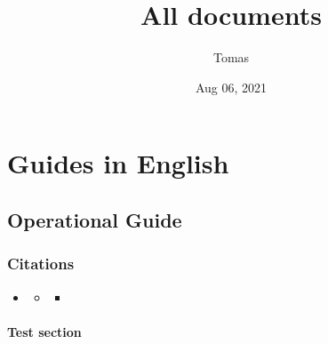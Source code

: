 \documentclass[a4paper,10pt,openany,oneside,english]{sphinxmanual}
\title{All documents}
\date{Aug 06, 2021}
\author{Tomas}
\begin{document}
\pagestyle{empty}
\sphinxmaketitle
\pagestyle{plain}
\sphinxtableofcontents
\pagestyle{normal}
\label{\detokenize{index::doc}}



\chapter{Guides in English}
\label{\detokenize{index:guides-in-english}}

\section{Operational Guide}
\label{\detokenize{index:operational-guide}}

\subsection{Citations}
\label{\detokenize{guides/operational/cso/citations:citations}}\label{\detokenize{guides/operational/cso/citations::doc}}
\begin{sphinxShadowBox}
\begin{itemize}
\item {} 
\sphinxAtStartPar
{}\label{\detokenize{guides/operational/cso/citations:id6}}{\hyperref[\detokenize{guides/operational/cso/citations:citations}]{}}
\begin{itemize}
\item {} 
\sphinxAtStartPar
{}\label{\detokenize{guides/operational/cso/citations:id7}}{\hyperref[\detokenize{guides/operational/cso/citations:test-section}]{}}
\begin{itemize}
\item {} 
\sphinxAtStartPar
{}\label{\detokenize{guides/operational/cso/citations:id8}}{\hyperref[\detokenize{guides/operational/cso/citations:test-subsection}]{}}

\end{itemize}

\end{itemize}

\end{itemize}
\end{sphinxShadowBox}


\subsubsection{Test section}
\label{\detokenize{guides/operational/cso/citations:test-section}}
\end{document}
